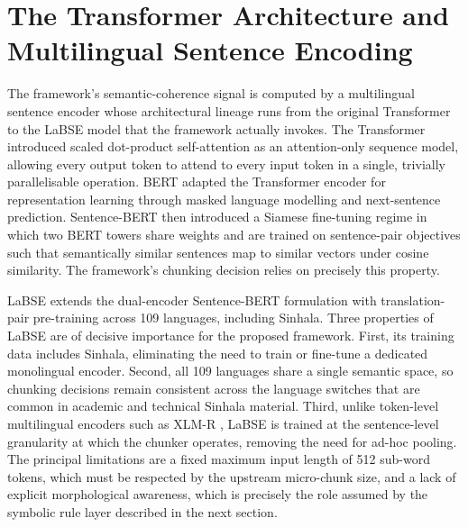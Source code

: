 \documentclass[12pt,a4paper,oneside]{report}
\begin{document}
\section{The Transformer Architecture and Multilingual Sentence Encoding}
\label{sec:tech-transformer}
The framework's semantic-coherence signal is computed by a multilingual sentence encoder whose architectural lineage runs from the original Transformer to the LaBSE model that the framework actually invokes. The Transformer \cite{vaswani2017attention} introduced scaled dot-product self-attention as an attention-only sequence model, allowing every output token to attend to every input token in a single, trivially parallelisable operation. BERT \cite{devlin2019bert} adapted the Transformer encoder for representation learning through masked language modelling and next-sentence prediction. Sentence-BERT \cite{reimers2019sbert} then introduced a Siamese fine-tuning regime in which two BERT towers share weights and are trained on sentence-pair objectives such that semantically similar sentences map to similar vectors under cosine similarity. The framework's chunking decision relies on precisely this property.

LaBSE \cite{feng2022labse} extends the dual-encoder Sentence-BERT formulation with translation-pair pre-training across 109 languages, including Sinhala. Three properties of LaBSE are of decisive importance for the proposed framework. First, its training data includes Sinhala, eliminating the need to train or fine-tune a dedicated monolingual encoder. Second, all 109 languages share a single semantic space, so chunking decisions remain consistent across the language switches that are common in academic and technical Sinhala material. Third, unlike token-level multilingual encoders such as XLM-R \cite{conneau2020xlmr}, LaBSE is trained at the sentence-level granularity at which the chunker operates, removing the need for ad-hoc pooling. The principal limitations are a fixed maximum input length of 512 sub-word tokens, which must be respected by the upstream micro-chunk size, and a lack of explicit morphological awareness, which is precisely the role assumed by the symbolic rule layer described in the next section.
\end{document}
